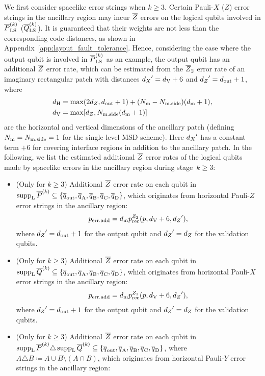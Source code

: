 \documentclass[
 prx,
 reprint,
 superscriptaddress,
 longbibliography,
 dvipsnames
]{revtex4-2}
\begin{document}
\begin{widetext}
We first consider spacelike error strings when $k \geq 3$.
Certain Pauli-$X$ ($Z$) error strings in the ancillary region may incur $\overline{Z}$ errors on the logical qubits involved in $\overline{P}^{(k)}_{\mathrm{LS}}$ ($\overline{Q}^{(k)}_{\mathrm{LS}}$).
It is guaranteed that their weights are not less than the corresponding code distances, as shown in Appendix~\ref{app:layout_fault_tolerance}.
Hence, considering the case where the output qubit is involved in $\overline{P}^{(k)}_{\mathrm{LS}}$ as an example, the output qubit has an additional $\overline{Z}$ error rate, which can be estimated from the $\overline{Z}_2$ error rate of an imaginary rectangular patch with distances ${d_X}' = d_{\mathrm{V}} + 6$ and ${d_Z}' = d_{\mathrm{out}} + 1$, where
\begin{align*}
    d_{\mathrm{H}} &= \max(2{d_Z}, d_{\mathrm{out}} + 1) + (N_{\mathrm{m}} - N_{\mathrm{m.side}})(d_{\mathrm{m}} + 1), \\
    d_{\mathrm{V}} &= \max[{d_Z}, N_{\mathrm{m.side}} (d_{\mathrm{m}} + 1)]
\end{align*}
are the horizontal and vertical dimensions of the ancillary patch (defining $N_{\mathrm{m}} = N_{\mathrm{m.side}} = 1$ for the single-level MSD scheme).
Here ${d_X}'$ has a constant term $+6$ for covering interface regions in addition to the ancillary patch.
In the following, we list the estimated additional $\overline{Z}$ error rates of the logical qubits made by spacelike errors in the ancillary region during stage~$k \geq 3$:
\begin{itemize}
    \item (Only for $k \geq 3$) Additional $\overline{Z}$ error rate on each qubit in $\operatorname{supp}_{\mathrm{L}}{\overline{P}^{(k)}} \subseteq \qty{\overline{q}_{\text{out}}, \overline{q}_{\text{A}}, \overline{q}_{\text{B}}, \overline{q}_{\text{C}}, \overline{q}_{\text{D}}}$, which originates from horizontal Pauli-$Z$ error strings in the ancillary region:
    \begin{align*}
        p_{\mathrm{err.add}} = d_{\mathrm{m}} p_{\mathrm{rec}}^{Z_2} (p, d_{\mathrm{V}} + 6, {d_Z}'),
    \end{align*}
    where ${d_Z}' = d_{\mathrm{out}} + 1$ for the output qubit and ${d_Z}' = {d_Z}$ for the validation qubits.
    \item (Only for $k \geq 3$) Additional $\overline{Z}$ error rate on each qubit in $\operatorname{supp}_{\mathrm{L}}{\overline{Q}^{(k)}} \subseteq \qty{\overline{q}_{\text{out}}, \overline{q}_{\text{A}}, \overline{q}_{\text{B}}, \overline{q}_{\text{C}}, \overline{q}_{\text{D}}}$, which originates from horizontal Pauli-$X$ error strings in the ancillary region:
    \begin{align*}
        p_{\mathrm{err.add}} = d_{\mathrm{m}} p_{\mathrm{rec}}^{Z_1} (p, d_{\mathrm{V}} + 6, {d_Z}'),
    \end{align*}
    where ${d_Z}' = d_{\mathrm{out}} + 1$ for the output qubit and ${d_Z}' = {d_Z}$ for the validation qubits.
    \item (Only for $k \geq 3$) Additional $\overline{Z}$ error rate on each qubit in $\operatorname{supp}_{\mathrm{L}}{\overline{P}^{(k)}} \triangle \operatorname{supp}_{\mathrm{L}}{\overline{Q}^{(k)}} \subseteq \qty{\overline{q}_{\text{out}}, \overline{q}_{\text{A}}, \overline{q}_{\text{B}}, \overline{q}_{\text{C}}, \overline{q}_{\text{D}}}$, where $A \triangle B \coloneqq A \cup B \setminus (A \cap B)$, which originates from horizontal Pauli-$Y$ error strings in the ancillary region:

\end{itemize}
\end{widetext}
\end{document}
